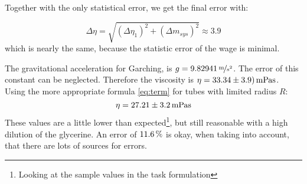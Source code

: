 Together with the only statistical error, we get the final error with:

\begin{equation}
\Delta \eta = \sqrt{\left(\Delta \eta_1\right)^2 + \left(\Delta m_{sys}\right)^2} \approx 3.9
\end{equation}
which is nearly the same, because the statistic error of the wage is minimal.

The gravitational acceleration for Garching, is $g = \unitfrac[9.82941]{m}{s^2}$. The error of this constant can be neglected. Therefore the viscosity is $\eta = \unit[33.34 \pm 3.9)]{mPa s} $.\\
Using the more appropriate formula \ref{eq:term} for tubes with limited radius $R$:
\begin{equation}
\eta = \unit[27.21 \pm 3.2]{mPa s}
\end{equation}
These values are a little lower than expected\footnote{Looking at the sample values in the task formulation}, but still reasonable with a high dilution of the glycerine. An error of $\unit[11.6]{\%}$ is okay, when taking into account, that there are lots of sources for errors.






